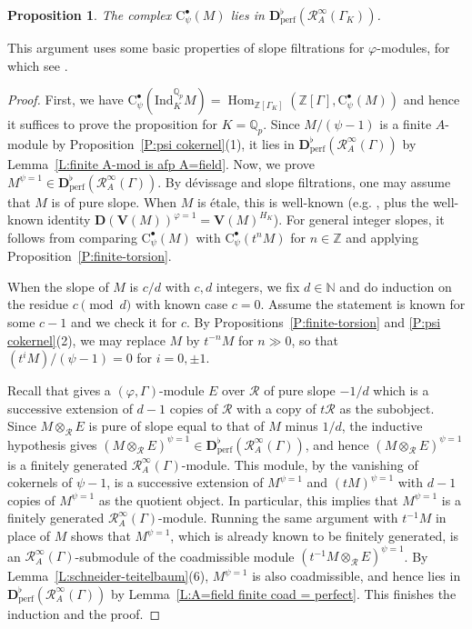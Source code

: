 \documentclass[12pt]{article}
\newtheorem{prop}[theorem]{Proposition}
\theoremstyle{definition}
\numberwithin{equation}{theorem}
\newcommand{\calR}{\mathcal{R}}
\newcommand{\QQ}{\mathbb{Q}}
\newcommand{\NN}{\mathbb{N}}
\newcommand{\ZZ}{\mathbb{Z}}
\newcommand{\bbD}{\mathbf{D}}
\newcommand{\rmC}{\mathrm{C}}
\newcommand{\Ind}{\mathrm{Ind}}
\newcommand{\perf}{\mathrm{perf}}
\def\Qp{\QQ_p}
\DeclareMathOperator{\Hom}{Hom}
\begin{document}
\begin{prop}
\label{P:Iwasawa cohomology A=field}
The complex $\rmC^\bullet_\psi(M)$ lies in $\bbD_\perf^\flat(\calR_A^\infty(\Gamma_K))$.
\end{prop}
This argument uses some basic properties of slope filtrations for $\varphi$-modules,
for which see  \cite[Theorem~1.7.1]{kedlaya-relative}.
\begin{proof}
First, we have
$\rmC^\bullet_\psi(\Ind_K^{\Qp} M)
= \Hom_{\ZZ[\Gamma_K]}(\ZZ[\Gamma], \rmC^\bullet_\psi(M))$ and hence it suffices to prove the proposition for $K=\Qp$. Since
$M/(\psi-1)$ is a finite $A$-module by Proposition~\ref{P:psi cokernel}(1), it lies in $\bbD_\perf^\flat(\calR_A^\infty(\Gamma))$ by Lemma~\ref{L:finite A-mod is afp A=field}.  Now, we prove $M^{\psi=1} \in \bbD_\perf^\flat(\calR_A^\infty(\Gamma))$.  By d\'evissage and slope filtrations, one may assume that $M$ is of pure slope.  When $M$ is \'etale, this is well-known (e.g. \cite[Th\'eor\`eme I.5.2 and Proposition V.1.18]{colmez-kirillov}, plus the well-known identity $\bbD(\mathbf{V}(M))^{\varphi=1} = \mathbf{V}(M)^{H_K}$).
For general integer slopes, it follows from comparing $\rmC^\bullet_\psi(M)$ with $\rmC^\bullet_\psi(t^nM)$ for $n \in \ZZ$ and applying Proposition~\ref{P:finite-torsion}.

When the slope of $M$ is $c/d$ with $c,d$ integers, we fix $d \in \NN$ and do induction on the residue $c \pmod d$ with known case $c=0$.  Assume the statement is known for some $c-1$ and we check it for $c$.  By Propositions~\ref{P:finite-torsion} and \ref{P:psi cokernel}(2), we may replace $M$ by $t^{-n}M$ for $n\gg0$, so that $(t^iM)/(\psi-1)=0$ for $i=0,\pm1$.

Recall that \cite[Lemma~5.2]{liu} gives a $(\varphi, \Gamma)$-module
$E$ over $\calR$ of pure slope $-1/d$ which is a successive extension
of $d-1$ copies of $\calR$ with a copy of $t\calR$ as the subobject.
Since $M \otimes_\calR E$ is pure of slope equal to that of $M$ minus
$1/d$, the inductive hypothesis gives $(M \otimes_\calR E)^{\psi=1}
\in \bbD_\perf^\flat (\calR_A^\infty(\Gamma))$, and hence $(M
\otimes_\calR E)^{\psi=1}$ is a finitely generated
$\calR_A^\infty(\Gamma)$-module.  This module, by the vanishing of
cokernels of $\psi-1$, is a successive extension of $M^{\psi=1}$ and
$(tM)^{\psi=1}$ with $d-1$ copies of $M^{\psi=1}$ as the quotient
object.  In particular, this implies that $M^{\psi=1}$ is a finitely
generated $\calR_A^\infty(\Gamma)$-module.  Running the same argument
with $t^{-1}M$ in place of $M$ shows that $M^{\psi=1}$, which is
already known to be finitely generated, is an
$\calR_A^\infty(\Gamma)$-submodule of the coadmissible module
$(t^{-1}M \otimes_\calR E)^{\psi=1}$.  By
Lemma~\ref{L:schneider-teitelbaum}(6), $M^{\psi=1}$ is also
coadmissible, and hence lies in
$\bbD_\perf^\flat(\calR_A^\infty(\Gamma))$ by Lemma~\ref{L:A=field
  finite coad = perfect}.  This finishes the induction and the proof.
\end{proof}
\end{document}
